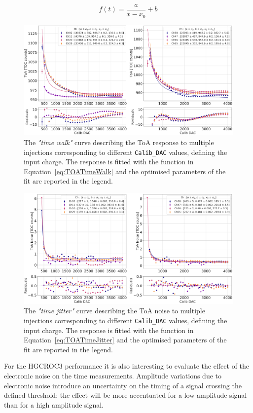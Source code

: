 \begin{equation}
    f(t) = \frac{a}{x-x_0}+b
\label{eq:TOATimeWalk}
\end{equation}

\bigbreak

\begin{figure}
    \centering
    \includegraphics[width=0.7\linewidth]{Figures/HGCAL/TOA_Injection.pdf}
    \caption{The \textit{"time walk"} curve describing the ToA response to multiple injections corresponding to different \texttt{Calib\_DAC} values, defining the input charge. The  response is fitted with the function in Equation~\ref{eq:TOATimeWalk} and the optimised parameters of the fit are reported in the legend.}
    \label{fig:TOA_Injection}
\end{figure}

\begin{figure}[b!]
    \centering
    \includegraphics[width=0.7\linewidth]{Figures/HGCAL/ToANoise_Injection.pdf}
    \caption{The \textit{"time jitter"} curve describing the ToA noise to multiple injections corresponding to different \texttt{Calib\_DAC} values, defining the input charge. The  response is fitted with the function in Equation~\ref{eq:TOATimeJitter} and the optimised parameters of the fit are reported in the legend.}
    \label{fig:TOANoise_Injection}
\end{figure}

For the HGCROC3 performance it is also interesting to evaluate the effect of the electronic noise on the time measurements. Amplitude variations due to electronic noise introduce an uncertainty on the timing of a signal crossing the defined threshold: the effect will be more accentuated for a low amplitude signal than for a high amplitude signal.

